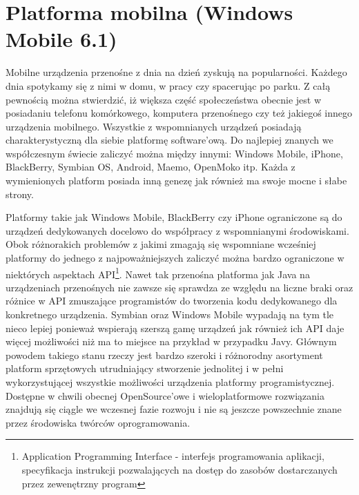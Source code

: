 \section{Platforma mobilna (Windows Mobile 6.1)}
Mobilne urządzenia przenośne z dnia na dzień zyskują na popularności. Każdego
dnia spotykamy się z nimi w domu, w pracy czy spacerując po parku. Z całą pewnością
można stwierdzić, iż większa część społeczeństwa obecnie jest w posiadaniu
telefonu komórkowego, komputera przenośnego czy też jakiegoś innego urządzenia
mobilnego. Wszystkie z wspomnianych urządzeń posiadają charakterystyczną dla
siebie platformę software'ową. Do najlepiej znanych we współczesnym świecie
zaliczyć można między innymi: Windows Mobile, iPhone, BlackBerry, Symbian OS, Android, Maemo, OpenMoko
itp. Każda z wymienionych platform posiada inną genezę jak również ma swoje
mocne i słabe strony.

Platformy takie jak Windows Mobile, BlackBerry czy iPhone ograniczone są do
urządzeń dedykowanych docelowo do współpracy z wspomnianymi środowiskami. Obok
różnorakich problemów z jakimi zmagają się wspomniane wcześniej platformy do
jednego z najpoważniejszych zaliczyć można bardzo ograniczone w niektórych
aspektach API\footnote{Application Programming Interface - interfejs
programowania aplikacji, specyfikacja instrukcji pozwalających na dostęp do
zasobów dostarczanych przez zewenętrzny program}. Nawet tak przenośna platforma
jak Java na urządzeniach przenośnych nie zawsze się sprawdza ze względu na liczne
braki oraz różnice w API zmuszające programistów do tworzenia kodu dedykowanego
dla konkretnego urządzenia. Symbian oraz Windows Mobile wypadają na tym tle nieco
lepiej ponieważ wspierają szerszą gamę urządzeń jak również ich API daje więcej
możliwości niż ma to miejsce na przykład w przypadku Javy. Głównym powodem
takiego stanu rzeczy jest bardzo szeroki i różnorodny asortyment platform
sprzętowych utrudniający stworzenie jednolitej i w pełni wykorzystującej
wszystkie możliwości urządzenia platformy programistycznej. Dostępne w chwili
obecnej OpenSource'owe i wieloplatformowe rozwiązania znajdują się ciągle we
wczesnej fazie rozwoju i nie są jeszcze powszechnie znane przez środowiska
twórców oprogramowania.

